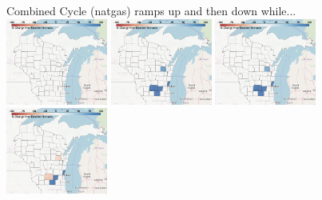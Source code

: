 \documentclass[xcolor=dvipsnames]{beamer}
\begin{document}
\begin{frame}

  Combined Cycle (natgas) ramps up and then down while... \\
  \includegraphics[width=0.25\textwidth]{includes/no_leakage_no_shutdowns_CC_r0.png}
  \includegraphics[width=0.25\textwidth]{includes/no_leakage_no_shutdowns_CC_r2.png}
  \includegraphics[width=0.25\textwidth]{includes/no_leakage_no_shutdowns_CC_r3.png}
  \includegraphics[width=0.25\textwidth]{includes/no_leakage_no_shutdowns_CC_r4.png}




\end{frame}
\end{document}
